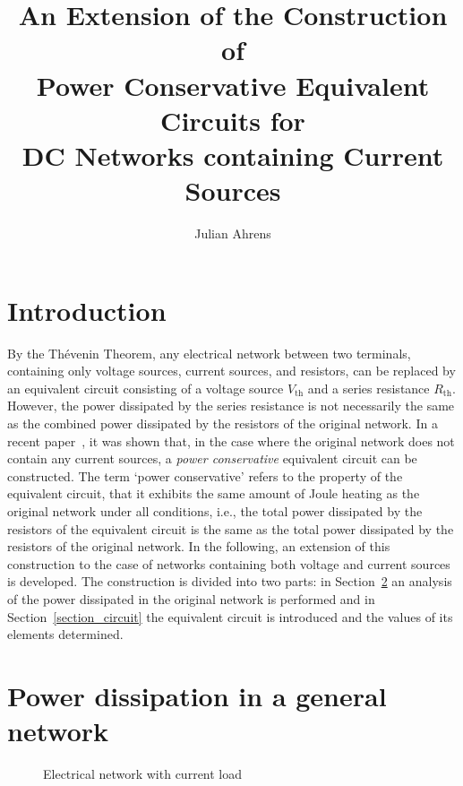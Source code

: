 \documentclass[twoside]{IEEEtran}
\newcommand{\opth}{{\operatorname{th}}}
\begin{document}
\title{An Extension of the Construction of\\Power Conservative Equivalent Circuits for\\DC Networks containing Current Sources}
\author{Julian Ahrens}
\maketitle

\section{Introduction}
\label{section_introduction}

By the Th\'{e}venin Theorem, any electrical network between two terminals, containing only voltage sources, current sources, and resistors, can be replaced by an equivalent circuit consisting of a voltage source $V_{\opth}$ and a series resistance $R_{\opth}$.
However, the power dissipated by the series resistance is not necessarily the same as the combined power dissipated by the resistors of the original network.
In a recent paper~\cite{Bar20}, it was shown that, in the case where the original network does not contain any current sources, a \emph{power conservative} equivalent circuit can be constructed.
The term `power conservative' refers to the property of the equivalent circuit, that it exhibits the same amount of Joule heating as the original network under all conditions, i.e., the total power dissipated by the resistors of the equivalent circuit is the same as the total power dissipated by the resistors of the original network.
In the following, an extension of this construction to the case of networks containing both voltage and current sources is developed.
The construction is divided into two parts: in Section~\ref{section_power} an analysis of the power dissipated in the original network is performed and in Section~\ref{section_circuit} the equivalent circuit is introduced and the values of its elements determined.

\section{Power dissipation in a general network}
\label{section_power}

\begin{figure}
  \centering
  
  \caption{Electrical network with current load}
  \label{figure_loaded_network}
\end{figure}
\end{document}
